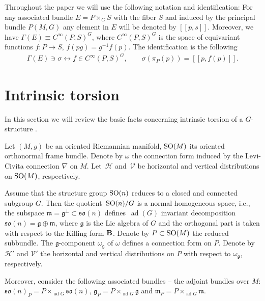 \documentclass[pdftex]{sigma}
\numberwithin{equation}{section}
\begin{document}
Throughout the paper we will use the following notation and identif\/ication: For any associated bundle $E=P\times_G S$ with the f\/iber $S$ and induced by the principal bundle $P(M,G)$ any element in $E$ will be denoted by $[[p,s]]$. Moreover, we have $\Gamma(E)\equiv C^{\infty}(P,S)^G$, where $C^{\infty}(P,S)^G$ is the space of equivariant functions $f\colon P\to S$, $f(pg)=g^{-1}f(p)$. The identif\/ication is the following
\begin{gather*}
\Gamma(E)\ni\sigma\longleftrightarrow f\in C^{\infty}(P,S)^G,\qquad \sigma(\pi_P(p))=[[p,f(p)]].
\end{gather*}

\section{Intrinsic torsion}\label{section2}

In this section we will review the basic facts concerning intrinsic torsion of a $G$-structure \cite{gmc2,cw2}.

Let $(M,g)$ be an oriented Riemannian manifold, ${\rm SO}(M)$ its oriented orthonormal frame bundle. Denote by $\omega$ the connection form induced by the Levi-Civita connection $\nabla$ on $M$. Let~$\mathcal{H}$ and~$\mathcal{V}$ be horizontal and vertical distributions on ${\rm SO}(M)$, respectively.

Assume that the structure group ${\rm SO}(n)$ reduces to a closed and connected subgroup $G$. Then the quotient~${\rm SO}(n)/G$ is a normal homogeneous space, i.e., the subspace $\mathfrak{m}=\mathfrak{g}^{\bot}\subset \mathfrak{so}(n)$ def\/ines~$\operatorname{ad}(G)$ invariant decomposition $\mathfrak{so}(n)=\mathfrak{g}\oplus \mathfrak{m}$, where $\mathfrak{g}$ is the Lie algebra of $G$ and the orthogonal part is taken with respect to the Killing form ${\bf B}$. Denote by $P\subset {\rm SO}(M)$ the reduced subbundle. The $\mathfrak{g}$-component $\omega_{\mathfrak{g}}$ of $\omega$ def\/ines a connection form on $P$. Denote by $\mathcal{H}'$ and $\mathcal{V}'$ the horizontal and vertical distributions on $P$ with respect to $\omega_{\mathfrak{g}}$, respectively.

Moreover, consider the following associated bundles -- the adjoint bundles over $M$: $\mathfrak{so}(n)_P=P\times_{\operatorname{ad}G}\mathfrak{so}(n)$, $\mathfrak{g}_P=P\times_{\operatorname{ad}G}\mathfrak{g}$ and $\mathfrak{m}_P=P\times_{\operatorname{ad}G}\mathfrak{m}$.
\end{document}
